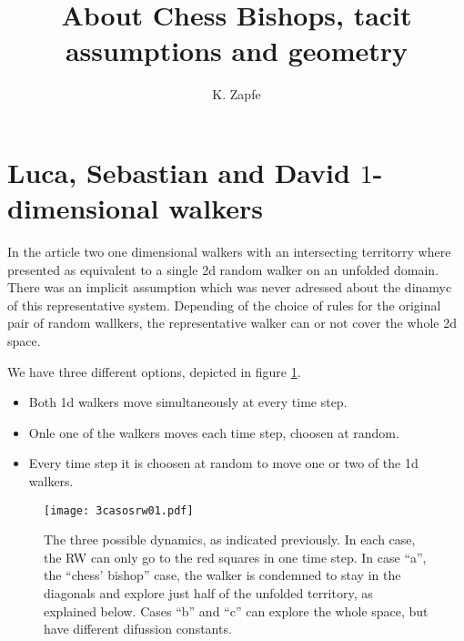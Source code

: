 \documentclass[leterpaper, 12pt]{article}
\title{About Chess Bishops, tacit assumptions and geometry}
\author{K. Zapfe}
\begin{document}
\maketitle


\section{Luca, Sebastian and David $1$-dimensional walkers}

In the article \cite{SandersLuca} two one dimensional walkers 
with an intersecting territorry where presented as equivalent
to a single 2d random walker on an unfolded domain. There
was an implicit assumption which was never adressed about the dinamyc 
of this representative system. Depending of the choice of
rules for the original pair of random wallkers, the representative walker
can or not cover the whole 2d space.

We have three different options, depicted in figure \ref{3casos}.

\begin{itemize}
\item Both 1d walkers move simultaneously at every time step.
\item Onle one of the walkers moves each time step, choosen at random.
\item Every time step it is  choosen at random to move one or two of the
  1d walkers.
\end{itemize}


\begin{figure}[h]
  \centering
  \texttt{[image: 3casosrw01.pdf]}
  \caption{The three possible dynamics, as indicated previously.
  In each case, the RW can only go to the red squares in one
time step. In case ``a'', the ``chess' bishop'' case, the walker is
condemned to stay in the diagonals and explore just half of the
unfolded territory, as explained below. Cases ``b'' and ``c'' can
explore the whole space, but have different difussion constants. }
  \label{3casos}
\end{figure}
\end{document}
